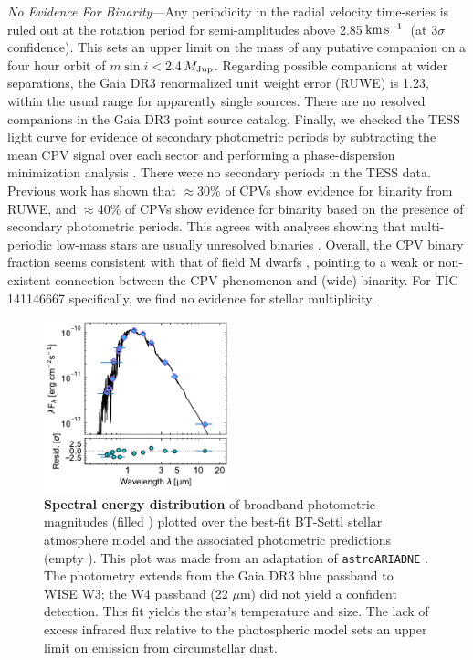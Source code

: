 \documentclass[11pt,twocolumn,tighten]{aastex7}
\newcommand{\kms}{\ensuremath{\rm km\,s^{-1}}}
\begin{document}
{\it No Evidence For Binarity}---Any periodicity in the radial
velocity time-series is ruled out at the rotation period for
semi-amplitudes above 2.85\,\kms\ (at 3$\sigma$ confidence).  This
sets an upper limit on the mass of any putative companion on a four
hour orbit of $m \sin i $$<$2.4\,$M_{\rm Jup}$.  Regarding possible
companions at wider separations, the Gaia DR3 renormalized unit weight
error (RUWE) is 1.23, within the usual
range for apparently single sources.  There are no resolved companions
in the Gaia DR3 point source catalog.  Finally, we checked the TESS
light curve for evidence of secondary photometric periods by
subtracting the mean CPV signal over each sector and performing a
phase-dispersion minimization analysis
\citep{Stellingwerf1978,2021zndo...1011188B}.  There were no secondary
periods in the TESS data.  Previous work \citep{Bouma2024} has shown
that $\approx$30\% of CPVs show evidence for binarity from RUWE, and
$\approx$40\% of CPVs show evidence for binarity based on the presence
of secondary photometric periods.  This agrees with analyses showing
that multi-periodic low-mass stars are usually unresolved binaries
\citep{Tokovinin2018}.  Overall, the CPV binary fraction seems
consistent with that of field M dwarfs \citep{Winters2019}, pointing
to a weak or non-existent connection between the CPV phenomenon and
(wide) binarity.  For TIC\,141146667 specifically, we find no
evidence for stellar multiplicity.


\begin{figure}[!t]
  \centering
  \includegraphics[width=0.48\textwidth]{f4.pdf}
  \caption{
    {\bf Spectral energy distribution} of broadband photometric
    magnitudes (filled ) plotted over the best-fit
    BT-Settl stellar atmosphere model \citep{Allard2012} and the
    associated photometric predictions (empty ).  This plot was made from an adaptation of
    \texttt{astroARIADNE} \citep{Vines2022}.  The photometry extends
    from the Gaia DR3 blue passband to WISE W3; the W4 passband (22
    $\mu$m) did not yield a confident detection.  This fit yields the
    star's temperature and size.  The lack of excess infrared flux
    relative to the photospheric model sets an upper limit on emission
    from circumstellar dust.
    }
  \label{fig:sed}
\end{figure}
\end{document}
